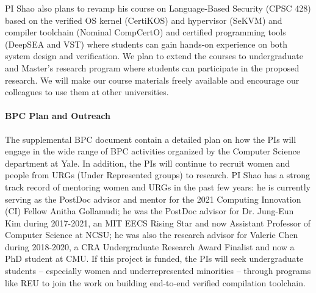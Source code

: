 PI Shao also plans to revamp his course on Language-Based Security
(CPSC 428) based on the verified OS kernel (CertiKOS) and hypervisor
(SeKVM) and compiler toolchain (Nominal CompCertO) and certified
programming tools (DeepSEA and VST) where students can gain hands-on
experience on both system design and verification. We plan to extend
the courses to undergraduate and Master's research program where
students can participate in the proposed research. We will make our
course materials freely available and encourage our colleagues to use
them at other universities.

\vspace*{-2ex}
\paragraph*{BPC Plan and Outreach}
The supplemental BPC document contain a detailed plan on how the PIs
will engage in the wide range of BPC activities organized by the
Computer Science department at Yale. In addition, the PIs will
continue to recruit women and people from URGs (Under Represented
groups) to research.  PI Shao has a strong track record of mentoring
women and URGs in the past few years: he is currently serving as the
PostDoc advisor and mentor for the 2021 Computing Innovation (CI)
Fellow Anitha Gollamudi; he was the PostDoc advisor for Dr. Jung-Eun
Kim during 2017-2021, an MIT EECS Rising Star and now Assistant
Professor of Computer Science at NCSU; he was also the research
advisor for Valerie Chen during 2018-2020, a CRA Undergraduate
Research Award Finalist and now a PhD student at CMU.  If this project
is funded, the PIs will seek undergraduate students – especially women
and underrepresented minorities – through programs like REU to join
the work on building end-to-end verified compilation toolchain.


